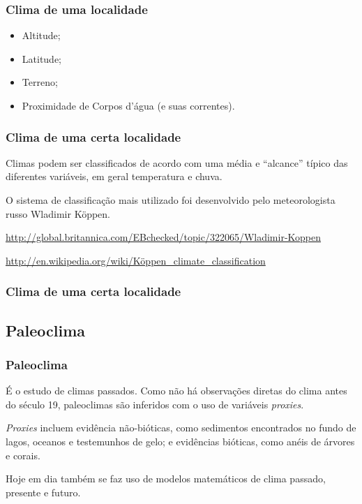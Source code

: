 \begin{frame}
\frametitle{Clima de uma localidade}
  \begin{itemize}[<+-| alert@+>]
    \item Altitude;
    \item Latitude;
    \item Terreno;
    \item Proximidade de Corpos d'água (e suas correntes).
  \end{itemize}
\end{frame}

\begin{frame}
\frametitle{Clima de uma certa localidade}
  \begin{block}{}
    Climas podem ser classificados de acordo com uma média e ``alcance'' típico
    das diferentes variáveis, em geral temperatura e chuva.
  \end{block}
\pause
  \begin{block}{}
    O sistema de classificação mais utilizado foi desenvolvido pelo
    meteorologista russo Wladimir Köppen.
  \end{block}
\pause
{\scriptsize
\url{http://global.britannica.com/EBchecked/topic/322065/Wladimir-Koppen}

\href{http://en.wikipedia.org/wiki/K\%C3\%B6ppen_climate_classification}{http://en.wikipedia.org/wiki/Köppen\_climate\_classification}
}
\end{frame}

\begin{frame}
\frametitle{Clima de uma certa localidade}
  \begin{center}
  \end{center}
\end{frame}

\subsection{Paleoclima}
\begin{frame}
\frametitle{Paleoclima}
  \begin{block}{}
    É o estudo de climas passados.  Como não há observações diretas do clima
    antes do século 19, paleoclimas são inferidos com o uso de variáveis
    {\it proxies}.
  \end{block}
  \pause
  \begin{block}{}
    {\it Proxies} incluem evidência não-bióticas, como sedimentos
    encontrados no fundo de lagos, oceanos e testemunhos de gelo; e evidências
    bióticas, como anéis de árvores e corais.
  \end{block}
  \pause
  \begin{block}{}
    Hoje em dia também se faz uso de modelos matemáticos de clima passado, presente e futuro.
  \end{block}
\end{frame}

